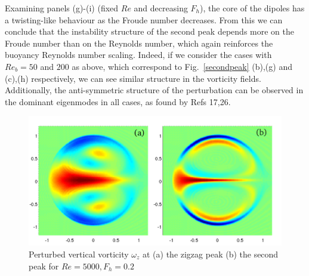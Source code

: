 Examining panels (g)-(i) (fixed $Re$ and decreasing $F_{h}$), the core of the dipoles has a twisting-like behaviour as the Froude number decreases. From this we can conclude that the instability structure of the second peak depends more on the Froude number than on the Reynolds number, which again reinforces the buoyancy Reynolds number scaling.  Indeed, if we consider the cases with $Re_{b}=50$ and $200$ as above, which correspond to Fig.~\ref{secondpeak} (b),(g) and (c),(h) respectively, we can see similar structure in the vorticity fields. Additionally, the anti-symmetric structure of the perturbation can be observed in the dominant eigenmodes in all cases, as found by Refs 17,26\nocite{bc1999,bc2000c}.

\begin{figure}
\begin{center}
\includegraphics[scale=0.5]{second_peak_vs_zigzag}
\caption{Perturbed vertical vorticity $\omega_{z}$ at (a) the zigzag peak (b) the second peak for $Re=5000, F_{h}=0.2$}
\label{zigzagcomparison}
\end{center}
\end{figure}

